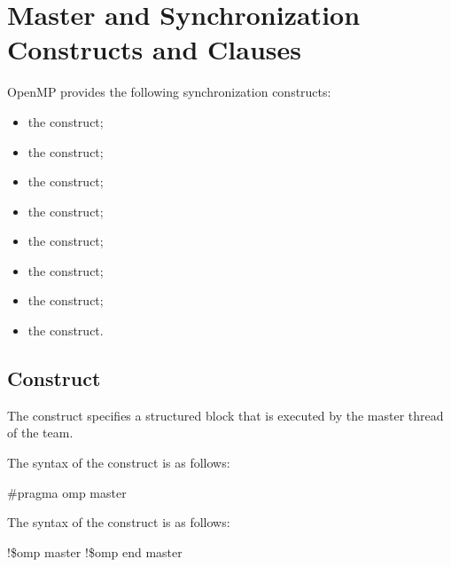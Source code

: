 \section{Master and Synchronization Constructs and Clauses}
\label{sec:Master and Synchronization Constructs and Clauses}
OpenMP provides the following synchronization constructs:
\begin{itemize}
\item the  construct;

\item the  construct;

\item the  construct;

\item the  construct;

\item the  construct;

\item the  construct;

\item the  construct;

\item the  construct.
\end{itemize}


\subsection{ Construct}
\label{subsec:master Construct}
\summary
The  construct specifies a structured block that is executed by the master thread 
of the team.

\syntax
\begin{ccppspecific}
The syntax of the  construct is as follows:

\begin{boxedcode}
\#pragma omp master 
\end{boxedcode}
\end{ccppspecific}

\begin{fortranspecific}
The syntax of the  construct is as follows:

\begin{boxedcode}
!\$omp master
!\$omp end master
\end{boxedcode}
\end{fortranspecific}

